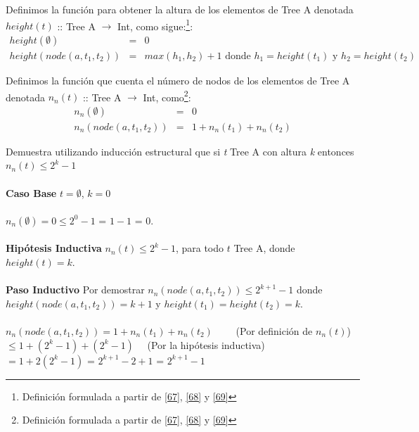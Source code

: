   \begin{definition}
        Definimos la función para obtener la altura de los elementos de Tree A denotada $height(t)$ :: Tree A $\rightarrow$ Int,  como sigue:\footnote{Definición formulada a partir de \hyperlink{67}{[67]}, \hyperlink{68}{[68]} y \hyperlink{69}{[69]}}:
       \[
            \begin{array}{rcl}
            	height(\emptyset) & = & 0 \\
           	height(node(a,t_1,t_2)) & = & max(h_1,h_2) + 1 \text{ donde } h_1 = height(t_1) \text{ y } h_2 = height(t_2)
         \end{array}
        \]
    \end{definition}
  
    \begin{definition}
        Definimos la función que cuenta el número de nodos de los elementos de Tree A denotada $n_n(t)$ :: Tree A $\rightarrow$ Int,  como\footnote{Definición formulada a partir de \hyperlink{67}{[67]}, \hyperlink{68}{[68]} y \hyperlink{69}{[69]}}:
        \[
            \begin{array}{rcl}
                 n_n(\emptyset)     &  =  & 0  \\
                 n_n(node(a,t_1,t_2))&  =  &1+ n_n(t_1)+n_n(t_2) 
            \end{array}
        \]

    \end{definition}

    \begin{exercise}
        Demuestra utilizando inducción estructural que si \textit{t} Tree A con altura \textit{k} entonces $n_n(t) \leq 2^k - 1$ \\\\
        \textbf{Caso Base} $t = \emptyset$, $k=0$\\\\
            $n_n(\emptyset) = 0  \leq 2^0 -1 $ = $1 -1$ = 0.\\\\
        \textbf{Hipótesis Inductiva} $n_n(t) \leq 2^k - 1$,  para todo $t$ Tree A, donde $height(t)=k$. \\\\
        \textbf{Paso Inductivo} Por demostrar $n_n(node(a,t_1,t_2)) \leq 2^{k+1} - 1$ donde $height(node(a,t_1,t_2)) = k + 1$ y $height(t_1) = height(t_2) = k$.\\\\
            $n_n(node(a,t_1,t_2)) = 1 + n_n(t_1) + n_n(t_2)$ \quad \quad \quad \quad \quad \quad \ \ \ \  (Por definición de $n_n(t)$) \\
            $\leq 1 + (2^{k} - 1) + (2^{k} - 1)$ \qquad \qquad \qquad \qquad \qquad \qquad  \ \ (Por la hipótesis inductiva) \\
            $= 1 + 2(2^{k} - 1)$ = $2^{k+1} - 2 + 1$ = $2^{k+1} - 1$\\
    \end{exercise}

